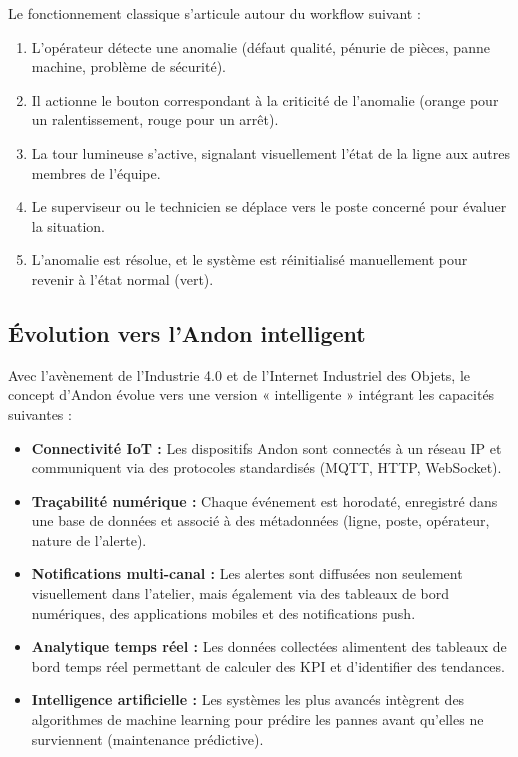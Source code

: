 Le fonctionnement classique s'articule autour du workflow suivant :

\begin{enumerate}
    \item L'opérateur détecte une anomalie (défaut qualité, pénurie de pièces, panne machine, problème de sécurité).
    \item Il actionne le bouton correspondant à la criticité de l'anomalie (orange pour un ralentissement, rouge pour un arrêt).
    \item La tour lumineuse s'active, signalant visuellement l'état de la ligne aux autres membres de l'équipe.
    \item Le superviseur ou le technicien se déplace vers le poste concerné pour évaluer la situation.
    \item L'anomalie est résolue, et le système est réinitialisé manuellement pour revenir à l'état normal (vert).
\end{enumerate}


\subsection{Évolution vers l'Andon intelligent}

Avec l'avènement de l'Industrie 4.0 et de l'Internet Industriel des Objets, le concept d'Andon évolue vers une version « intelligente » intégrant les capacités suivantes :

\begin{itemize}
    \item \textbf{Connectivité IoT :} Les dispositifs Andon sont connectés à un réseau IP et communiquent via des protocoles standardisés (MQTT, HTTP, WebSocket).
    
    \item \textbf{Traçabilité numérique :} Chaque événement est horodaté, enregistré dans une base de données et associé à des métadonnées (ligne, poste, opérateur, nature de l'alerte).
    
    \item \textbf{Notifications multi-canal :} Les alertes sont diffusées non seulement visuellement dans l'atelier, mais également via des tableaux de bord numériques, des applications mobiles et des notifications push.
    
    \item \textbf{Analytique temps réel :} Les données collectées alimentent des tableaux de bord temps réel permettant de calculer des KPI et d'identifier des tendances.
    
    \item \textbf{Intelligence artificielle :} Les systèmes les plus avancés intègrent des algorithmes de machine learning pour prédire les pannes avant qu'elles ne surviennent (maintenance prédictive).
\end{itemize}



